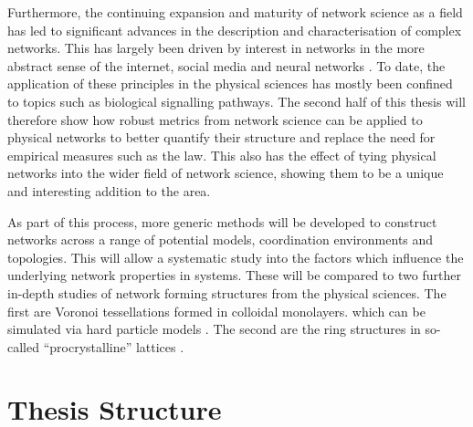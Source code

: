 Furthermore, the continuing expansion and maturity of network science as a field has led to significant advances in the description and characterisation of complex networks.
This has largely been driven by interest in networks in the more abstract sense of the internet, social media and neural networks \cite{Strogatz2001,Boccaletti2006,Barabasi2012}.
To date, the application of these principles in the physical sciences has mostly been confined to topics such as biological signalling pathways.
The second half of this thesis will therefore show how robust metrics from network science can be applied to physical \td{} networks to better quantify their structure and replace the need for empirical measures such as the \aw{} law.
This also has the effect of tying physical \td{} networks into the wider field of network science, showing them to be a unique and interesting addition to the area.

As part of this process, more generic methods will be developed to construct \td{} networks across a range of potential models, coordination environments and topologies.
This will allow a systematic study into the factors which influence the underlying network properties in \td{} systems.
These will be compared to two further in\--depth studies of network forming structures from the physical sciences.
The first are Voronoi tessellations formed in colloidal monolayers.
which can be simulated via hard particle models \cite{Thorneywork2017}.
The second are the ring structures in so\--called ``procrystalline'' lattices \cite{Overy2016}.


\section{Thesis Structure}

